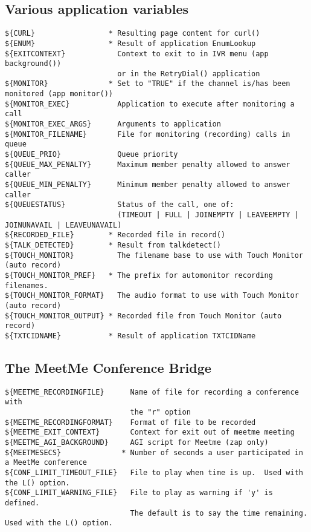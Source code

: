 \subsection{Various application variables}
\begin{verbatim}
${CURL}                 * Resulting page content for curl()
${ENUM}                 * Result of application EnumLookup
${EXITCONTEXT}            Context to exit to in IVR menu (app background())
                          or in the RetryDial() application
${MONITOR}              * Set to "TRUE" if the channel is/has been monitored (app monitor())
${MONITOR_EXEC}           Application to execute after monitoring a call
${MONITOR_EXEC_ARGS}      Arguments to application
${MONITOR_FILENAME}       File for monitoring (recording) calls in queue
${QUEUE_PRIO}             Queue priority
${QUEUE_MAX_PENALTY}      Maximum member penalty allowed to answer caller
${QUEUE_MIN_PENALTY}      Minimum member penalty allowed to answer caller
${QUEUESTATUS}            Status of the call, one of:
                          (TIMEOUT | FULL | JOINEMPTY | LEAVEEMPTY | JOINUNAVAIL | LEAVEUNAVAIL)
${RECORDED_FILE}        * Recorded file in record()
${TALK_DETECTED}        * Result from talkdetect()
${TOUCH_MONITOR}          The filename base to use with Touch Monitor (auto record)
${TOUCH_MONITOR_PREF}   * The prefix for automonitor recording filenames.
${TOUCH_MONITOR_FORMAT}   The audio format to use with Touch Monitor (auto record)
${TOUCH_MONITOR_OUTPUT} * Recorded file from Touch Monitor (auto record)
${TXTCIDNAME}           * Result of application TXTCIDName
\end{verbatim}

\subsection{The MeetMe Conference Bridge}
\begin{verbatim}
${MEETME_RECORDINGFILE}      Name of file for recording a conference with
                             the "r" option
${MEETME_RECORDINGFORMAT}    Format of file to be recorded
${MEETME_EXIT_CONTEXT}       Context for exit out of meetme meeting
${MEETME_AGI_BACKGROUND}     AGI script for Meetme (zap only)
${MEETMESECS}              * Number of seconds a user participated in a MeetMe conference
${CONF_LIMIT_TIMEOUT_FILE}   File to play when time is up.  Used with the L() option.
${CONF_LIMIT_WARNING_FILE}   File to play as warning if 'y' is defined.
                             The default is to say the time remaining.  Used with the L() option.
\end{verbatim}

